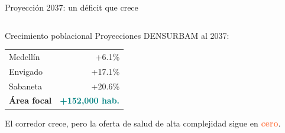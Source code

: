 \documentclass[aspectratio=169, 11pt]{beamer}
\newcommand{\highlight}[1]{\textcolor{teal}{\textbf{#1}}}
\newcommand{\danger}[1]{\textcolor{coral}{\textbf{#1}}}
\begin{document}
{\begin{frame}{Proyección 2037: un déficit que crece}
\begin{columns}[T]
\vspace{4pt}
\begin{block}{\small Crecimiento poblacional}
\scriptsize
Proyecciones DENSURBAM al 2037:

\vspace{2pt}
\begin{tabular}{@{}lr@{}}
Medellín & +6.1\% \\
Envigado & +17.1\% \\
Sabaneta & +20.6\% \\
\textbf{Área focal} & \highlight{+152,000 hab.} \\
\end{tabular}

\vspace{3pt}
El corredor crece, pero la oferta de salud de alta complejidad sigue en \danger{cero}.
\end{block}

\end{columns}
\end{frame}
}
\end{document}
